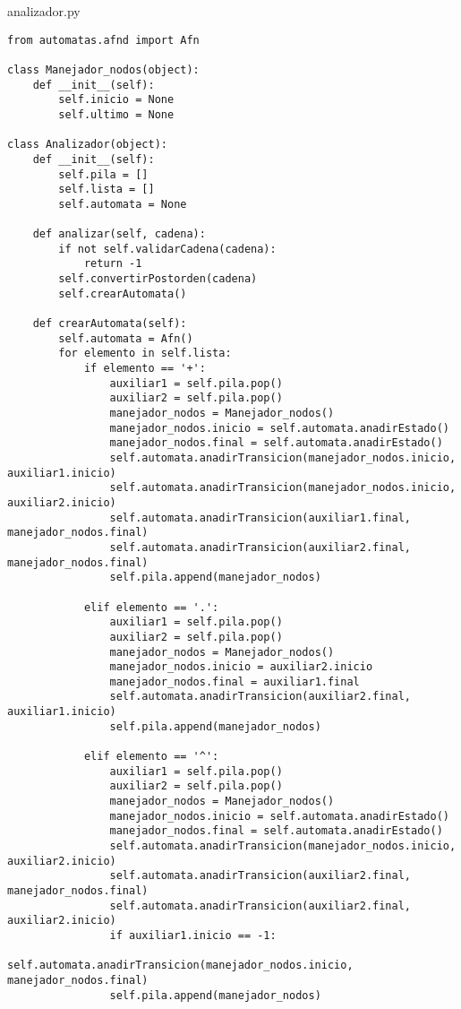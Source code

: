 analizador.py
\lstset{language=Python, breaklines=true, basicstyle=\footnotesize}
\begin{lstlisting}[frame=single]
from automatas.afnd import Afn

class Manejador_nodos(object):
    def __init__(self):
        self.inicio = None
        self.ultimo = None

class Analizador(object):
    def __init__(self):
        self.pila = []
        self.lista = []
        self.automata = None

    def analizar(self, cadena):
        if not self.validarCadena(cadena):
            return -1
        self.convertirPostorden(cadena)
        self.crearAutomata()

    def crearAutomata(self):
        self.automata = Afn()
        for elemento in self.lista:
            if elemento == '+':
                auxiliar1 = self.pila.pop()
                auxiliar2 = self.pila.pop()
                manejador_nodos = Manejador_nodos()
                manejador_nodos.inicio = self.automata.anadirEstado()
                manejador_nodos.final = self.automata.anadirEstado()
                self.automata.anadirTransicion(manejador_nodos.inicio, auxiliar1.inicio)
                self.automata.anadirTransicion(manejador_nodos.inicio, auxiliar2.inicio)
                self.automata.anadirTransicion(auxiliar1.final, manejador_nodos.final)
                self.automata.anadirTransicion(auxiliar2.final, manejador_nodos.final)
                self.pila.append(manejador_nodos)

            elif elemento == '.':
                auxiliar1 = self.pila.pop()
                auxiliar2 = self.pila.pop()
                manejador_nodos = Manejador_nodos()
                manejador_nodos.inicio = auxiliar2.inicio
                manejador_nodos.final = auxiliar1.final
                self.automata.anadirTransicion(auxiliar2.final, auxiliar1.inicio)
                self.pila.append(manejador_nodos)

            elif elemento == '^':
                auxiliar1 = self.pila.pop()
                auxiliar2 = self.pila.pop()
                manejador_nodos = Manejador_nodos()
                manejador_nodos.inicio = self.automata.anadirEstado()
                manejador_nodos.final = self.automata.anadirEstado()
                self.automata.anadirTransicion(manejador_nodos.inicio, auxiliar2.inicio)
                self.automata.anadirTransicion(auxiliar2.final, manejador_nodos.final)
                self.automata.anadirTransicion(auxiliar2.final, auxiliar2.inicio)
                if auxiliar1.inicio == -1:
                    self.automata.anadirTransicion(manejador_nodos.inicio, manejador_nodos.final)
                self.pila.append(manejador_nodos)


\end{lstlisting}
